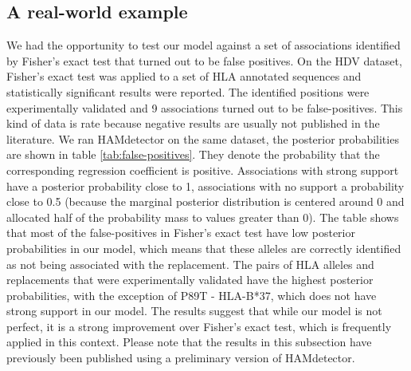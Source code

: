 \documentclass[fleqn,11pt]{SelfArx} %
\begin{document}
\subsection{A real-world example}

We had the opportunity to test our model against a set of associations identified by Fisher's exact test that turned out to be false positives.
On the HDV dataset, Fisher's exact test was applied to a set of HLA annotated sequences and statistically significant results were reported. The identified positions were experimentally validated and 9 associations turned out to be false-positives.
This kind of data is rate because negative results are usually not published in the literature.
We ran HAMdetector on the same dataset, the posterior probabilities are shown in table \ref{tab:false-positives}. They denote the probability that the corresponding regression coefficient is positive. Associations with strong support have a posterior probability close to 1, associations with no support a probability close to 0.5 (because the marginal posterior distribution is centered around 0 and allocated half of the probability mass to values greater than 0).
The table shows that most of the false-positives in Fisher's exact test have low posterior probabilities in our model, which means that these alleles are correctly identified as not being associated with the replacement. The pairs of HLA alleles and replacements that were experimentally validated have the highest posterior probabilities, with the exception of P89T - HLA-B*37, which does not have strong support in our model.
The results suggest that while our model is not perfect, it is a strong improvement over Fisher's exact test, which is frequently applied in this context. Please note that the results in this subsection have previously been published using a preliminary version of HAMdetector. 
\end{document}
